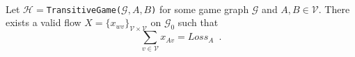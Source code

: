 \begin{lemma} \ \\
  \label{gameflow}
  Let $\mathcal{H} = $\texttt{TransitiveGame(}$\mathcal{G}, A, B$\texttt{)} for some game graph $\mathcal{G}$ and $A,
  B \in \mathcal{V}$. There exists a valid flow
  $X = \{x_{wv}\}_{\mathcal{V} \times \mathcal{V}}$ on $\mathcal{G}_0$ such that
  \begin{equation*}
    \sum\limits_{v \in \mathcal{V}}x_{Av} = Loss_A \enspace.
  \end{equation*}
\end{lemma}
